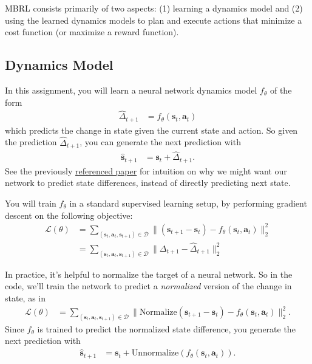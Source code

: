 \documentclass{article} %
\newcommand{\bs}{\mathbf{s}}
\newcommand{\ba}{\mathbf{a}}
\begin{document}
MBRL consists primarily of two aspects: (1) learning a dynamics model and (2) using the learned dynamics models to plan and execute actions that minimize a cost function (or maximize a reward function).

\subsection{Dynamics Model}

In this assignment, you will learn a neural network dynamics model $f_\theta$ of the form
\begin{align}
\hat{\Delta}_{t+1} &= f_\theta(\bs_t, \ba_t)
\end{align}
which predicts the change in state given the current state and action. So given the prediction $\hat{\Delta}_{t+1}$, you can generate the next prediction with
\begin{align}
\hat{\bs}_{t+1} &= \bs_t + \hat{\Delta}_{t+1} .
\end{align}
See the previously \href{https://arxiv.org/pdf/1708.02596.pdf}{referenced paper} for intuition on why we might want our network to predict state differences, instead of directly predicting next state.

You will train $f_\theta$ in a standard supervised learning setup, by performing gradient descent on the following objective:
\begin{align}
\mathcal{L}(\theta) &= \sum_{(\bs_t, \ba_t, \bs_{t+1}) \in \mathcal{D}} \| (\bs_{t+1} - \bs_t) - f_\theta(\bs_t, \ba_t) \|_2^2 \\
&= \sum_{(\bs_t, \ba_t, \bs_{t+1}) \in \mathcal{D}} \| \Delta_{t+1} - \hat{\Delta}_{t+1} \|_2^2 \label{eqn:train-dynamics}
\end{align}

In practice, it's helpful to normalize the target of a neural network.
So in the code, we'll train the network to predict a \emph{normalized} version of the change in state, as in
\begin{align}
\mathcal{L}(\theta) &= \sum_{(\bs_t, \ba_t, \bs_{t+1}) \in \mathcal{D}} \| \text{Normalize}(\bs_{t+1} - \bs_t) - f_\theta(\bs_t, \ba_t) \|_2^2.
\end{align}
Since $f_\theta$ is trained to predict the normalized state difference, you generate the next prediction with
\begin{align}
\hat{\bs}_{t+1} &= \bs_t + \text{Unnormalize}(f_\theta(\bs_t, \ba_t)).
\end{align}
\end{document}
